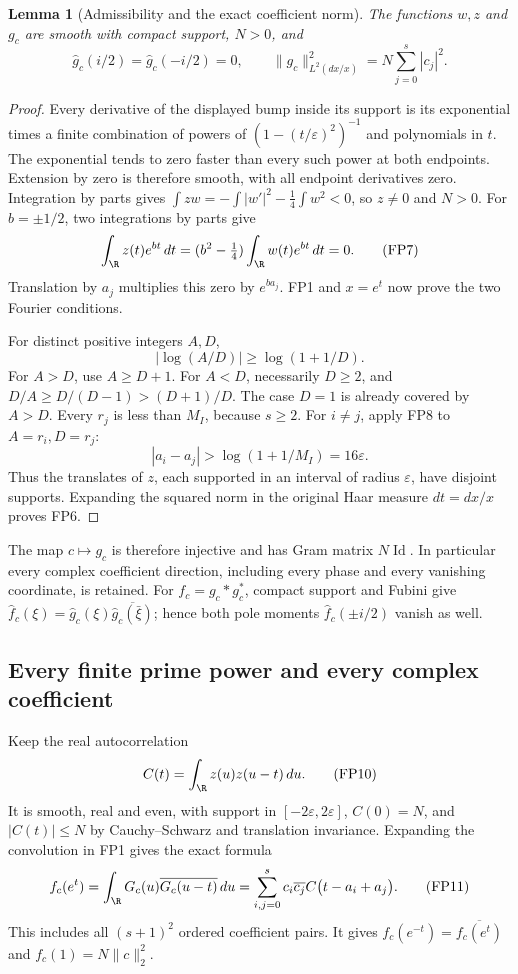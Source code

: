 \documentclass[11pt,a4paper]{article}
\newtheorem{lemma}[theorem]{Lemma}
\theoremstyle{definition}\newtheorem{definition}[theorem]{Definition}
\begin{document}
\begin{lemma}[Admissibility and the exact coefficient norm]
\label{fp:lem:admissible}
The functions \(w,z\) and \(g_c\) are smooth with compact support,
\(N>0\), and
\[
 \widehat g_c(i/2)=\widehat g_c(-i/2)=0,\qquad
 \|g_c\|_{L^2(dx/x)}^2=N\sum_{j=0}^s|c_j|^2 .
 \tag{FP6}\label{fp:fpb:norm}
\]
\end{lemma}
\begin{proof}
Every derivative of the displayed bump inside its support is its
exponential times a finite combination of powers of
\((1-(t/\varepsilon)^2)^{-1}\) and polynomials in \(t\). The exponential
tends to zero faster than every such power at both endpoints.
Extension by zero is therefore smooth, with all endpoint
derivatives zero. Integration by parts gives
\(\int zw=-\int|w'|^2-\tfrac14\int w^2<0\), so \(z\ne0\) and \(N>0\).
For \(b=\pm1/2\), two integrations by parts give
\[
 \int_{\R}z(t)e^{bt}\,dt
   =(b^2-\tfrac14)\int_{\R}w(t)e^{bt}\,dt=0.
 \tag{FP7}
\]
Translation by \(a_j\) multiplies this zero by \(e^{ba_j}\).
FP1 and \(x=e^t\) now prove the two Fourier conditions.

For distinct positive integers \(A,D\),
\[
 |\log(A/D)|\ge\log(1+1/D).
 \tag{FP8}\label{fp:fpb:integer-gap}
\]
For \(A>D\), use \(A\ge D+1\). For \(A<D\), necessarily \(D\ge2\),
and \(D/A\ge D/(D-1)>(D+1)/D\). The case \(D=1\) is already
covered by \(A>D\).
Every \(r_j\) is less than \(M_I\), because \(s\ge2\).
For \(i\ne j\), apply FP8 to \(A=r_i,D=r_j\):
\[
 |a_i-a_j|>\log(1+1/M_I)=16\varepsilon.
 \tag{FP9}\label{fp:fpb:centre-gap}
\]
Thus the translates of \(z\), each supported in an interval of
radius \(\varepsilon\), have disjoint supports. Expanding the squared
norm in the original Haar measure \(dt=dx/x\) proves FP6.
\end{proof}

The map \(c\mapsto g_c\) is therefore injective and has Gram
matrix \(N\operatorname{Id}\). In particular every complex coefficient direction,
including every phase and every vanishing coordinate, is retained.
For \(f_c=g_c*g_c^*\), compact support and Fubini give
\(\widehat f_c(\xi)=\widehat g_c(\xi)
\overline{\widehat g_c(\bar\xi)}\); hence both pole moments
\(\widehat f_c(\pm i/2)\) vanish as well.

\subsection{Every finite prime power and every complex coefficient}

Keep the real autocorrelation
\[
 C(t)=\int_{\R}z(u)z(u-t)\,du.
 \tag{FP10}\label{fp:fpb:C}
\]
It is smooth, real and even, with support in
\([-2\varepsilon,2\varepsilon]\), \(C(0)=N\), and \(|C(t)|\le N\) by
Cauchy--Schwarz and translation invariance.
Expanding the convolution in FP1 gives the exact formula
\[
 f_c(e^t)=\int_{\R}G_c(u)\overline{G_c(u-t)}\,du
   =\sum_{i,j=0}^s c_i\overline{c_j}
                  C\bigl(t-a_i+a_j\bigr).
 \tag{FP11}\label{fp:fpb:convolution}
\]
This includes all \((s+1)^2\) ordered coefficient pairs. It gives
\(f_c(e^{-t})=\overline{f_c(e^t)}\) and
\(f_c(1)=N\|c\|_2^2\).
\end{document}
